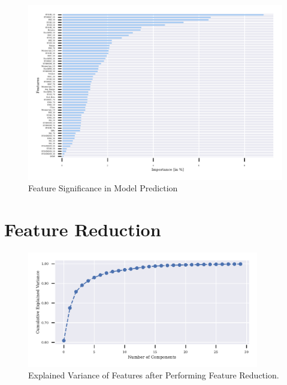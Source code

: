 \begin{figure}[h]
\centering
\begin{adjustbox}{max width=1.2\textwidth,center}
\includegraphics[scale=1.2]{./pdf/report/feature_importance.pdf}
\end{adjustbox}
\caption{Feature Significance in Model Prediction}
\label{fig:feature_importance}
\end{figure}


\section{Feature Reduction}
\begin{figure}[h]
\centering
\includegraphics[width=0.9\textwidth]{./pdf/report/explained_variance.pdf}
\caption{Explained Variance of Features after Performing Feature Reduction.}
\label{fig:explained_variance}
\end{figure}

